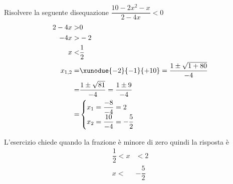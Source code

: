 	Risolvere la seguente disequazione $\dfrac{10-2x^2-x}{2-4x}< 0$
	\begin{align*}
		2-4x>&0\\
		-4x>&-2\\
		x<&\dfrac{1}{2}\\
		x_{1,2}=&\xunodue{-2}{-1}{+10}=\dfrac{1\pm\sqrt{1+80}}{-4}\\
		=&\dfrac{1\pm\sqrt{81}}{-4}=\dfrac{1\pm 9}{-4}\\
		=&\begin{cases}
			x_1=\dfrac{-8}{-4}=2\\
			x_2=\dfrac{10}{-4}=-\dfrac{5}{2}
		\end{cases}\\
	\end{align*}
	\begin{center}
		
	\end{center}
	L'esercizio chiede quando la frazione è minore di zero quindi la risposta è
	\begin{align*}
		\dfrac{1}{2}<x&<2\\ x<&-\dfrac{5}{2}\\
	\end{align*}

